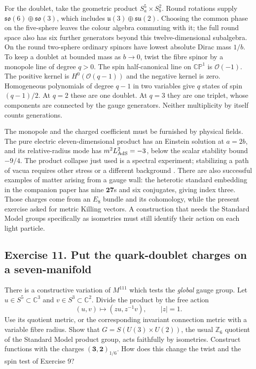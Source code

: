 \documentclass[10pt]{article}
\begin{document}
For the doublet, take the geometric product $S^5_a\times S^2_b$. Round rotations supply $\mathfrak{so}(6)\oplus\mathfrak{so}(3)$, which includes $\mathfrak u(3)\oplus\mathfrak{su}(2)$. Choosing the common phase on the five-sphere leaves the colour algebra commuting with it; the full round space also has six further generators beyond this twelve-dimensional subalgebra. On the round two-sphere ordinary spinors have lowest absolute Dirac mass $1/b$. To keep a doublet at bounded mass as $b\to0$, twist the fibre spinor by a monopole line of degree $q>0$. The spin half-canonical line on $\mathbb{CP}^1$ is $\mathcal O(-1)$. The positive kernel is $H^0(\mathcal O(q-1))$ and the negative kernel is zero. Homogeneous polynomials of degree $q-1$ in two variables give $q$ states of spin $(q-1)/2$. At $q=2$ these are one doublet. At $q=3$ they are one triplet, whose components are connected by the gauge generators. Neither multiplicity by itself counts generations.

The monopole and the charged coefficient must be furnished by physical fields. The pure electric eleven-dimensional product has an Einstein solution at $a=2b$, and its relative-radius mode has $m^2L_{\rm AdS}^2=-3$, below the scalar stability bound $-9/4$. The product collapse just used is a spectral experiment; stabilizing a path of vacua requires other stress or a different background \cite{SevenMTheory2026}. There are also successful examples of matter arising from a gauge wall: the heterotic standard embedding in the companion paper has nine $\mathbf{27}$s and six conjugates, giving index three. Those charges come from an $E_8$ bundle and its cohomology, while the present exercise asked for metric Killing vectors. A construction that needs the Standard Model groups specifically as isometries must still identify their action on each light particle.

\subsection{Exercise 11. Put the quark-doublet charges on a seven-manifold}
There is a constructive variation of $M^{111}$ which tests the \emph{global} gauge group. Let $u\in S^5\subset\mathbb C^3$ and $v\in S^3\subset\mathbb C^2$. Divide the product by the free action
\begin{equation}
 (u,v)\longmapsto(zu,z^{-1}v),\qquad |z|=1 .
\end{equation}
Use its quotient metric, or the corresponding invariant connection metric with a variable fibre radius. Show that $G=S(U(3)\times U(2))$, the usual $\mathbb Z_6$ quotient of the Standard Model product group, acts faithfully by isometries. Construct functions with the charges $(\mathbf3,\mathbf2)_{1/6}$. How does this change the twist and the spin test of Exercise 9?
\end{document}
